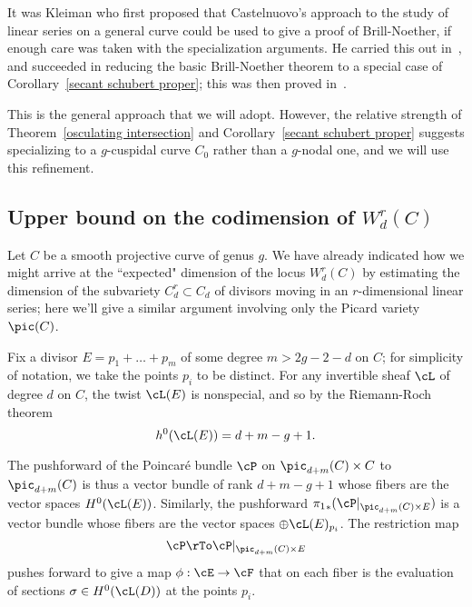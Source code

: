 
It was Kleiman who first proposed that Castelnuovo's approach to the study of linear series on a general curve could be used to give a proof of Brill-Noether, if enough care was taken with the specialization arguments. He carried this out in~\cite{Kleiman-special}, and succeeded in reducing the basic Brill-Noether theorem to a special case of Corollary~\ref{secant schubert proper}; this was then proved in~\cite{Griffiths-Harris-BN}.

This is the general approach that we will adopt. However, the relative strength of Theorem~\ref{osculating intersection} and Corollary~\ref{secant schubert proper} suggests specializing to a $g$-cuspidal curve $C_0$ rather than a $g$-nodal one, and we will use
this refinement.

\subsection{Upper bound on the codimension of $W^r_d(C)$}

Let $C$ be a smooth projective curve of genus $g$. We have already indicated how we might arrive at the ``expected" dimension of the locus $W^r_d(C)$ by estimating the dimension of the subvariety $C^r_d \subset C_d$ of divisors moving in an $r$-dimensional linear series; here we'll give a similar argument involving only the Picard variety $\pic(C)$.

Fix a divisor $E = p_1 + \dots + p_m$ of some degree $m > 2g-2-d$ on $C$; for simplicity of notation, we take the points $p_i$ to be distinct. For any invertible sheaf $\cL$ of degree $d$ on $C$, the twist $\cL(E)$ is nonspecial, and so by the Riemann-Roch theorem 
$$
h^0(\cL(E)) = d + m - g + 1.
$$

The pushforward of the Poincar\'e bundle $\cP$ on $\pic_{d+m}(C) \times C$ to $\pic_{d+m}(C)$ is thus a vector
bundle of rank $d + m - g + 1$ whose fibers are the vector spaces $H^0(\cL(E))$. Similarly,
the pushforward ${\pi_1}_*(\cP|_{\pic_{d+m}(C) \times E})$
is a vector bundle whose fibers are the vector spaces $\oplus \cL(E)_{p_i}$. The restriction map
$$
\cP  \rTo \cP|_{\pic_{d+m}(C) \times E}
$$
pushes forward to give a map $\phi : \cE \to \cF$ that on each fiber is the evaluation of sections $\sigma \in H^0(\cL(D))$ at the points $p_i$.


